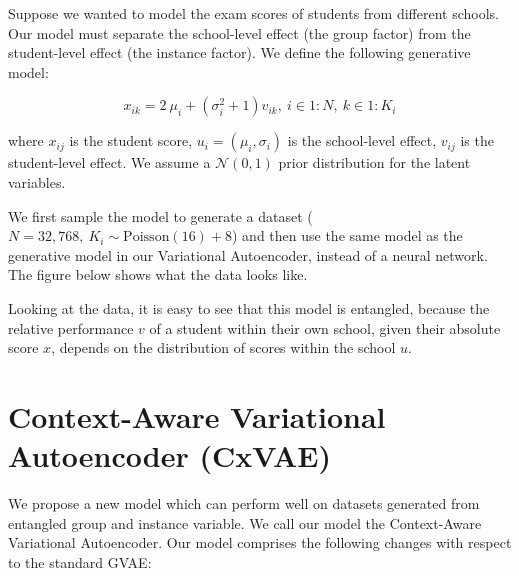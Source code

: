 \documentclass[nohyperref]{article}
\theoremstyle{plain}
\theoremstyle{definition}
\theoremstyle{remark}
\begin{document}
Suppose we wanted to model the exam scores of students from different schools. Our model must separate the school-level effect (the group factor) from the student-level effect (the instance factor). We define the following generative model:

$$x_{ik} = 2 ~ \mu_i +  (\sigma^2_i + 1) v_{ik}, ~ i \in 1:N, ~ k \in 1:K_i$$

where $x_{ij}$ is the student score, $u_i = (\mu_i, \sigma_i)$ is the school-level effect, $v_{ij}$ is the student-level effect. We assume a $\mathcal{N} (0, 1)$ prior distribution for the latent variables.

We first sample the model to generate a dataset ($N = 32,768, ~ K_i \sim \mathrm{Poisson} (16) + 8$) and then use the same model as the generative model in our Variational Autoencoder, instead of a neural network. The figure below shows what the data looks like.

Looking at the data, it is easy to see that this model is entangled, because the relative performance $v$ of a student within their own school, given their absolute score $x$, depends on the distribution of scores within the school $u$.

\section{Context-Aware Variational Autoencoder (CxVAE)}

We propose a new model which can perform well on datasets generated from entangled group and instance variable. We call our model the Context-Aware Variational Autoencoder. Our model comprises the following changes with respect to the standard GVAE:
\end{document}
